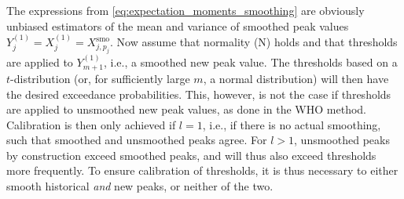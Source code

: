 \documentclass[12pt]{article}
\begin{document}
The expressions from \eqref{eq:expectation_moments_smoothing} are obviously unbiased estimators of the mean and variance of smoothed peak values  $Y_j^{(1)} =  X_j^{(1)} = X^{\text{smo}}_{j, p_j}$. Now assume that normality (N) holds and that thresholds are applied to $Y_{m + 1}^{(1)}$, i.e., a smoothed new peak value. The thresholds based on a $t$-distribution (or, for sufficiently large $m$, a normal distribution) will then have the desired exceedance probabilities. This, however, is not the case if thresholds are applied to unsmoothed new peak values, as done in the WHO method. Calibration is then only achieved if $l = 1$, i.e., if there is no actual smoothing, such that smoothed and unsmoothed peaks agree. For $l > 1$, unsmoothed peaks by construction exceed smoothed peaks, and will thus also exceed thresholds more frequently. %
To ensure calibration of thresholds, it is thus necessary to either smooth historical \textit{and} new peaks, or neither of the two. %

\end{document}
